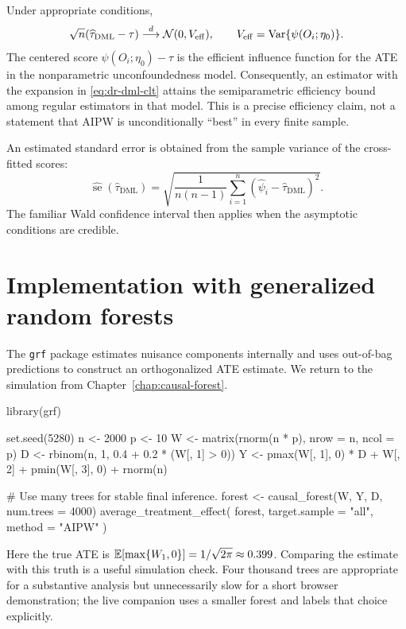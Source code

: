 Under appropriate conditions,
\begin{equation}
  \sqrt n(\widehat\tau_{\mathrm{DML}}-\tau)
  \overset{d}{\longrightarrow} \mathcal{N}(0,V_{\mathrm{eff}}),
  \qquad
  V_{\mathrm{eff}}=\operatorname{Var}\{\psi(O_i;\eta_0)\}.
  \label{eq:dr-dml-clt}
\end{equation}
The centered score $\psi(O_i;\eta_0)-\tau$ is the efficient influence function for
the ATE in the nonparametric unconfoundedness model.  Consequently, an estimator
with the expansion in \eqref{eq:dr-dml-clt} attains the semiparametric efficiency
bound among regular estimators in that model.  This is a precise efficiency claim,
not a statement that AIPW is unconditionally ``best'' in every finite sample.

An estimated standard error is obtained from the sample variance of the cross-fitted
scores:
\begin{equation}
  \widehat{\operatorname{se}}(\widehat\tau_{\mathrm{DML}})
  =\sqrt{\frac{1}{n(n-1)}
    \sum_{i=1}^n(\widehat\psi_i-\widehat\tau_{\mathrm{DML}})^2}.
  \label{eq:dr-dml-se}
\end{equation}
The familiar Wald confidence interval then applies when the asymptotic conditions
are credible.

\section{Implementation with generalized random forests}
\label{sec:dr-implementation}

The \texttt{grf} package estimates nuisance components internally and uses
out-of-bag predictions to construct an orthogonalized ATE estimate.  We return to
the simulation from Chapter~\ref{chap:causal-forest}.

\begin{rcode}
library(grf)

set.seed(5280)
n <- 2000
p <- 10
W <- matrix(rnorm(n * p), nrow = n, ncol = p)
D <- rbinom(n, 1, 0.4 + 0.2 * (W[, 1] > 0))
Y <- pmax(W[, 1], 0) * D + W[, 2] + pmin(W[, 3], 0) + rnorm(n)

# Use many trees for stable final inference.
forest <- causal_forest(W, Y, D, num.trees = 4000)
average_treatment_effect(
  forest,
  target.sample = "all",
  method = "AIPW"
)
\end{rcode}

Here the true ATE is
$\mathbb{E}[\max\{W_1,0\}]=1/\sqrt{2\pi}\approx0.399$.  Comparing the estimate with this
truth is a useful simulation check.  Four thousand trees are appropriate for a
substantive analysis but unnecessarily slow for a short browser demonstration; the
live companion uses a smaller forest and labels that choice explicitly.

